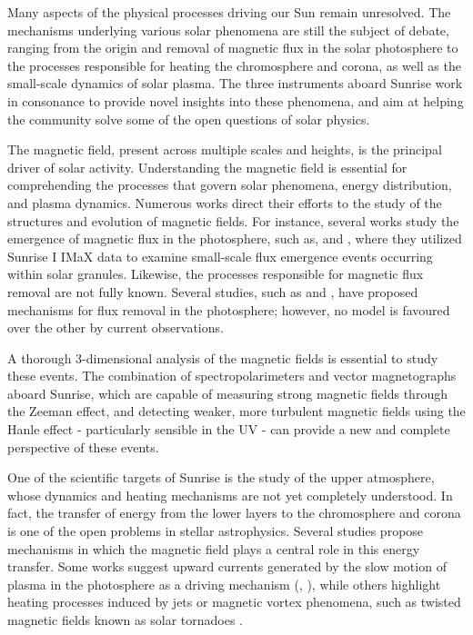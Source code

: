 Many aspects of the physical processes driving our Sun remain unresolved. The mechanisms underlying various solar phenomena are still the subject of debate, ranging from the origin and removal of magnetic flux in the solar photosphere to the processes responsible for heating the chromosphere and corona, as well as the small-scale dynamics of solar plasma. The three instruments aboard Sunrise work in consonance to provide novel insights into these phenomena, and aim at helping the community solve some of the open questions of solar physics. 

The magnetic field, present across multiple scales and heights, is the principal driver of solar activity. Understanding the magnetic field is essential for comprehending the processes that govern solar phenomena, energy distribution, and plasma dynamics. Numerous works direct their efforts to the study of the structures and evolution of magnetic fields. For instance, several works study  the emergence of magnetic flux in the photosphere, such as, \cite{flux_emergence_1} and \cite{flux_emergence_2}, where they utilized Sunrise I IMaX data to examine small-scale flux emergence events occurring within solar granules. Likewise, the processes responsible for magnetic flux removal are not fully known. Several studies, such as \cite{flux_removal_1} and \cite{flux_emergence_2}, have proposed mechanisms for flux removal in the photosphere; however, no model is favoured over the other by current observations.

A thorough 3-dimensional analysis of the magnetic fields is essential to study these events. The combination of spectropolarimeters and vector magnetographs aboard Sunrise, which are capable of measuring strong magnetic fields through the Zeeman effect, and detecting weaker, more turbulent \citep{quiet_sun_living_review} magnetic fields using the Hanle effect - particularly sensible in the UV - can provide a new and complete perspective of these events.  

One of the scientific targets of Sunrise is the study of the upper atmosphere, whose dynamics and heating mechanisms are not yet completely understood. In fact, the transfer of energy from the lower layers to the chromosphere and corona is one of the open problems in stellar astrophysics. Several studies propose mechanisms in which the magnetic field plays a central role in this energy transfer. Some works suggest upward currents generated by the slow motion of plasma in the photosphere as a driving mechanism (\cite{upwards1}, \cite{upwards2}), while others highlight heating processes induced by jets \citep{jetscorona} or magnetic vortex phenomena, such as twisted magnetic fields known as solar tornadoes \citep{solar_tornadoes}.

